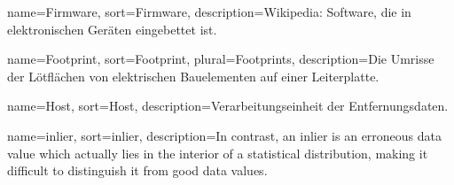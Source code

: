
{
	name={Firmware},
	sort={Firmware},
	description={Wikipedia: Software, die in elektronischen Geräten eingebettet ist.}
}

{
	name={Footprint}, sort={Footprint}, plural={Footprints},
	description={Die Umrisse der Lötflächen von elektrischen Bauelementen auf einer Leiterplatte.}
} %

{
	name={Host},
	sort={Host},
	description={Verarbeitungseinheit der Entfernungsdaten.}
}

{
	name={inlier}, sort={inlier},
	description={In contrast, an inlier is an erroneous data value which actually lies in the interior of a statistical distribution, making it difficult to distinguish it from good data values.}
} %



